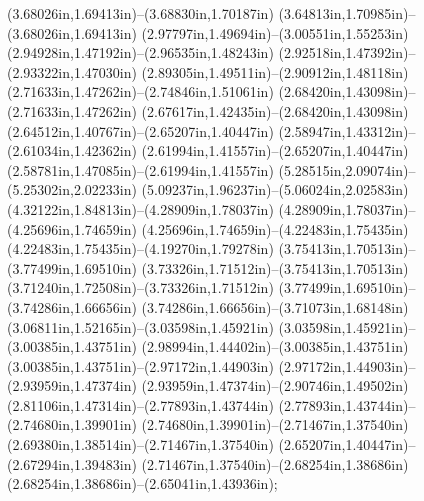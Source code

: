 (3.68026in,1.69413in)--(3.68830in,1.70187in) (3.64813in,1.70985in)--(3.68026in,1.69413in) (2.97797in,1.49694in)--(3.00551in,1.55253in) (2.94928in,1.47192in)--(2.96535in,1.48243in) (2.92518in,1.47392in)--(2.93322in,1.47030in) (2.89305in,1.49511in)--(2.90912in,1.48118in) (2.71633in,1.47262in)--(2.74846in,1.51061in) (2.68420in,1.43098in)--(2.71633in,1.47262in) (2.67617in,1.42435in)--(2.68420in,1.43098in) (2.64512in,1.40767in)--(2.65207in,1.40447in) (2.58947in,1.43312in)--(2.61034in,1.42362in) (2.61994in,1.41557in)--(2.65207in,1.40447in) (2.58781in,1.47085in)--(2.61994in,1.41557in) (5.28515in,2.09074in)--(5.25302in,2.02233in) (5.09237in,1.96237in)--(5.06024in,2.02583in) (4.32122in,1.84813in)--(4.28909in,1.78037in) (4.28909in,1.78037in)--(4.25696in,1.74659in) (4.25696in,1.74659in)--(4.22483in,1.75435in) (4.22483in,1.75435in)--(4.19270in,1.79278in) (3.75413in,1.70513in)--(3.77499in,1.69510in) (3.73326in,1.71512in)--(3.75413in,1.70513in) (3.71240in,1.72508in)--(3.73326in,1.71512in) (3.77499in,1.69510in)--(3.74286in,1.66656in) (3.74286in,1.66656in)--(3.71073in,1.68148in) (3.06811in,1.52165in)--(3.03598in,1.45921in) (3.03598in,1.45921in)--(3.00385in,1.43751in) (2.98994in,1.44402in)--(3.00385in,1.43751in) (3.00385in,1.43751in)--(2.97172in,1.44903in) (2.97172in,1.44903in)--(2.93959in,1.47374in) (2.93959in,1.47374in)--(2.90746in,1.49502in) (2.81106in,1.47314in)--(2.77893in,1.43744in) (2.77893in,1.43744in)--(2.74680in,1.39901in) (2.74680in,1.39901in)--(2.71467in,1.37540in) (2.69380in,1.38514in)--(2.71467in,1.37540in) (2.65207in,1.40447in)--(2.67294in,1.39483in) (2.71467in,1.37540in)--(2.68254in,1.38686in) (2.68254in,1.38686in)--(2.65041in,1.43936in);
